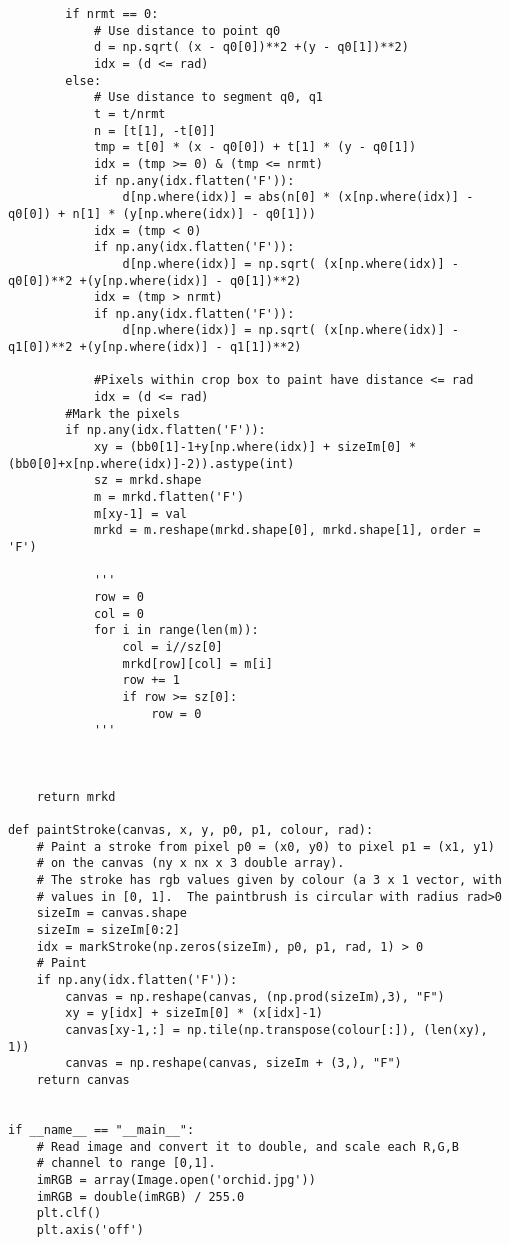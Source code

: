 \documentclass{article}
\begin{document}
\begin{lstlisting}
        if nrmt == 0:
            # Use distance to point q0
            d = np.sqrt( (x - q0[0])**2 +(y - q0[1])**2)
            idx = (d <= rad)
        else:
            # Use distance to segment q0, q1
            t = t/nrmt
            n = [t[1], -t[0]]
            tmp = t[0] * (x - q0[0]) + t[1] * (y - q0[1])
            idx = (tmp >= 0) & (tmp <= nrmt)
            if np.any(idx.flatten('F')):
                d[np.where(idx)] = abs(n[0] * (x[np.where(idx)] - q0[0]) + n[1] * (y[np.where(idx)] - q0[1]))
            idx = (tmp < 0)
            if np.any(idx.flatten('F')):
                d[np.where(idx)] = np.sqrt( (x[np.where(idx)] - q0[0])**2 +(y[np.where(idx)] - q0[1])**2)
            idx = (tmp > nrmt)
            if np.any(idx.flatten('F')):
                d[np.where(idx)] = np.sqrt( (x[np.where(idx)] - q1[0])**2 +(y[np.where(idx)] - q1[1])**2)

            #Pixels within crop box to paint have distance <= rad
            idx = (d <= rad)
        #Mark the pixels
        if np.any(idx.flatten('F')):
            xy = (bb0[1]-1+y[np.where(idx)] + sizeIm[0] * (bb0[0]+x[np.where(idx)]-2)).astype(int)
            sz = mrkd.shape
            m = mrkd.flatten('F')
            m[xy-1] = val
            mrkd = m.reshape(mrkd.shape[0], mrkd.shape[1], order = 'F')

            '''
            row = 0
            col = 0
            for i in range(len(m)):
                col = i//sz[0]
                mrkd[row][col] = m[i]
                row += 1
                if row >= sz[0]:
                    row = 0
            '''
            
            
            
    return mrkd

def paintStroke(canvas, x, y, p0, p1, colour, rad):
    # Paint a stroke from pixel p0 = (x0, y0) to pixel p1 = (x1, y1)
    # on the canvas (ny x nx x 3 double array).
    # The stroke has rgb values given by colour (a 3 x 1 vector, with
    # values in [0, 1].  The paintbrush is circular with radius rad>0
    sizeIm = canvas.shape
    sizeIm = sizeIm[0:2]
    idx = markStroke(np.zeros(sizeIm), p0, p1, rad, 1) > 0
    # Paint
    if np.any(idx.flatten('F')):
        canvas = np.reshape(canvas, (np.prod(sizeIm),3), "F")
        xy = y[idx] + sizeIm[0] * (x[idx]-1)
        canvas[xy-1,:] = np.tile(np.transpose(colour[:]), (len(xy), 1))
        canvas = np.reshape(canvas, sizeIm + (3,), "F")
    return canvas


if __name__ == "__main__":
    # Read image and convert it to double, and scale each R,G,B
    # channel to range [0,1].
    imRGB = array(Image.open('orchid.jpg'))
    imRGB = double(imRGB) / 255.0
    plt.clf()
    plt.axis('off')
    

\end{lstlisting}
\end{document}
